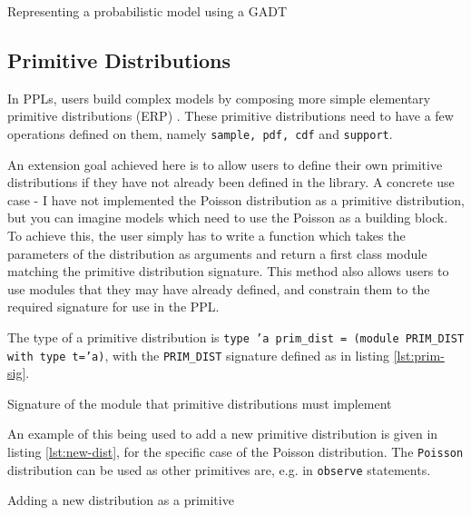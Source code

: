 \begin{listing}[!ht]
	\caption{Representing a probabilistic model using a GADT}
	\label{lst:gadt1}
\end{listing}

\subsection{Primitive Distributions}
In PPLs, users build complex models by composing more simple elementary primitive distributions (ERP) \cite{pmlr-v15-wingate11a}. These primitive distributions need to have a few operations defined on them, namely \texttt{sample, pdf, cdf} and \texttt{support}.

An extension goal achieved here is to allow users to define their own primitive distributions if they have not already been defined in the library. A concrete use case - I have not implemented the Poisson distribution as a primitive distribution, but you can imagine models which need to use the Poisson as a building block. To achieve this, the user simply has to write a function which takes the parameters of the distribution as arguments and return a first class module matching the primitive distribution signature. This method also allows users to use modules that they may have already defined, and constrain them to the required signature for use in the PPL.

The type of a primitive distribution is \texttt{type 'a prim\_dist = (module PRIM\_DIST with type t='a)}, with the \texttt{PRIM\_DIST} signature defined as in listing \ref{lst:prim-sig}. 

\begin{listing}[!ht]
	\caption{Signature of the module that primitive distributions must implement}
	\label{lst:prim-sig}
\end{listing}

An example of this being used to add a new primitive distribution is given in listing \ref{lst:new-dist}, for the specific case of the Poisson distribution. The \texttt{Poisson} distribution can be used as other primitives are, e.g. in \texttt{observe} statements.

\begin{listing}[!ht]
	\caption{Adding a new distribution as a primitive}
	\label{lst:new-dist}
\end{listing}

